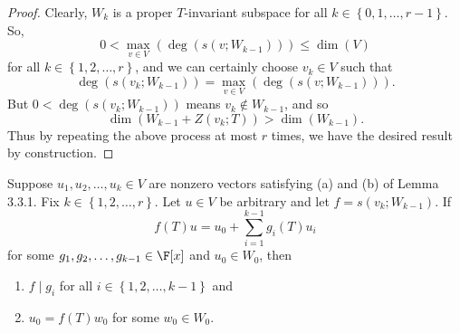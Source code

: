\documentclass[math_245.tex]{subfiles}
\begin{document}
    \begin{proof}
        Clearly, $W_k$ is a proper $T$-invariant subspace for all $k\in \left\lbrace 0,1,\ldots,r-1 \right\rbrace$. So,
        \begin{equation*}
            0 < \max_{v\in V}\left( \deg\left( s\left( v;W_{k-1} \right)  \right)  \right) \leq \dim(V)
        \end{equation*}
        for all $k\in\left\lbrace 1,2,\ldots,r \right\rbrace$, and we can certainly choose $v_k\in V$ such that
        \begin{equation*}
            \deg\left( s\left( v_k;W_{k-1} \right)  \right) = \max_{v\in V} \left( \deg\left( s(v;W_{k-1}) \right)  \right) .
        \end{equation*}
        But $0<\deg\left( s(v_k;W_{k-1}) \right) $ means $v_k\notin W_{k-1}$, and so
        \begin{equation*}
            \dim\left( W_{k-1}+Z(v_k;T) \right) > \dim(W_{k-1}).
        \end{equation*}
        Thus by repeating the above process at most $r$ times, we have the desired result by construction.
    \end{proof}

    \begin{lemma_inside}{}
        Suppose $u_1,u_2,\ldots,u_k\in V$ are nonzero vectors satisfying (a) and (b) of Lemma 3.3.1. Fix $k\in \left\lbrace 1,2,\ldots,r \right\rbrace$. Let $u\in V$ be arbitrary and let $f=s(v_k;W_{k-1})$. If
        \begin{equation*}
            f(T)u = u_0 + \sum^{k-1}_{i=1} g_i(T)u_i
        \end{equation*}
        for some $g_1,g_2,\ldots,g_{k-1}\in\F[x]$ and $u_0\in W_0$, then
        \begin{enumerate}
            \item $f\mid g_i$ for all $i\in\left\lbrace 1,2,\ldots,k-1 \right\rbrace$ and
            \item $u_0=f(T)w_0$ for some $w_0\in W_0$.
        \end{enumerate}
    \end{lemma_inside}
\end{document}
